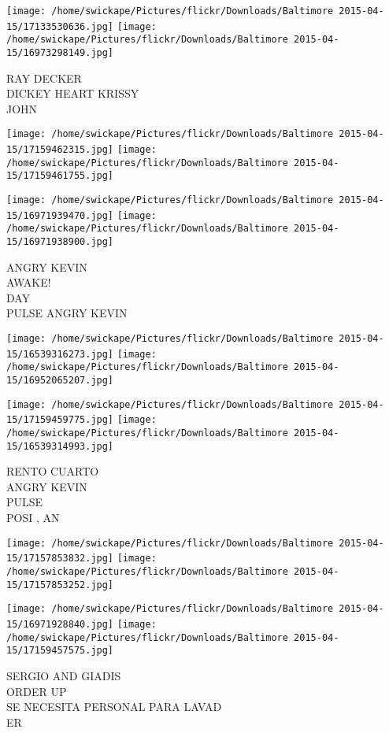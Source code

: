 \documentclass[10pt,letterpaper]{article}
\begin{document}
\vspace{0.25in}
\texttt{[image: /home/swickape/Pictures/flickr/Downloads/Baltimore 2015-04-15/17133530636.jpg]}
\texttt{[image: /home/swickape/Pictures/flickr/Downloads/Baltimore 2015-04-15/16973298149.jpg]}

RAY DECKER\\
DICKEY HEART KRISSY\\
JOHN
\pagebreak

\texttt{[image: /home/swickape/Pictures/flickr/Downloads/Baltimore 2015-04-15/17159462315.jpg]}
\texttt{[image: /home/swickape/Pictures/flickr/Downloads/Baltimore 2015-04-15/17159461755.jpg]}

\texttt{[image: /home/swickape/Pictures/flickr/Downloads/Baltimore 2015-04-15/16971939470.jpg]}
\texttt{[image: /home/swickape/Pictures/flickr/Downloads/Baltimore 2015-04-15/16971938900.jpg]}

ANGRY KEVIN\\
AWAKE!\\
DAY\\
PULSE ANGRY KEVIN
\pagebreak

\texttt{[image: /home/swickape/Pictures/flickr/Downloads/Baltimore 2015-04-15/16539316273.jpg]}
\texttt{[image: /home/swickape/Pictures/flickr/Downloads/Baltimore 2015-04-15/16952065207.jpg]}

\texttt{[image: /home/swickape/Pictures/flickr/Downloads/Baltimore 2015-04-15/17159459775.jpg]}
\texttt{[image: /home/swickape/Pictures/flickr/Downloads/Baltimore 2015-04-15/16539314993.jpg]}

RENTO CUARTO\\
ANGRY KEVIN\\
PULSE\\
POSI , AN
\pagebreak

\texttt{[image: /home/swickape/Pictures/flickr/Downloads/Baltimore 2015-04-15/17157853832.jpg]}
\texttt{[image: /home/swickape/Pictures/flickr/Downloads/Baltimore 2015-04-15/17157853252.jpg]}

\texttt{[image: /home/swickape/Pictures/flickr/Downloads/Baltimore 2015-04-15/16971928840.jpg]}
\texttt{[image: /home/swickape/Pictures/flickr/Downloads/Baltimore 2015-04-15/17159457575.jpg]}

SERGIO AND GIADIS\\
ORDER UP\\
SE NECESITA PERSONAL PARA LAVAD\\
ER
\pagebreak
\end{document}
